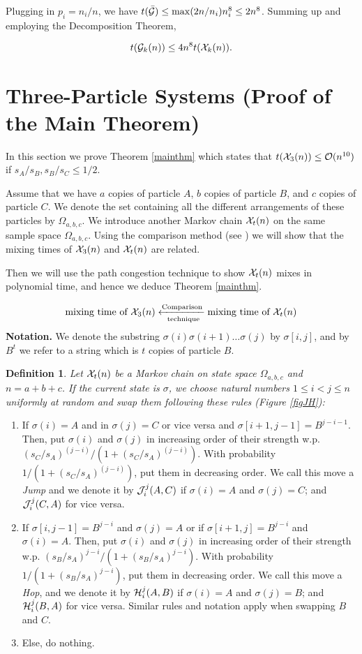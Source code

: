 \documentclass[10 pt]{article}
\newcommand{\G}{{\cal G}}
\newcommand{\EX}{{\cal X}}
\newcommand{\J}{{\cal J}}
\newcommand{\Ho}{{\cal H}}
\newtheorem{defin}{Definition}[section]
\begin{document}
Plugging in $p_i=n_i/n$, we have $t(\bar{\G})\leq \max( 2n/n_i) n_i^8\leq 2 n^8$. Summing up and employing the Decomposition Theorem,

$$t(\G_{k}(n))\leq 4 n^8 t(\EX_{k}(n)).$$

\section{ Three-Particle Systems (Proof of the Main Theorem)}\label{proof}

In this section we prove Theorem \ref{mainthm} which states that $t(\EX_3(n))\leq {\cal O}(n^{10}) $ if 
$s_A/s_B, s_B/s_C\leq 1/2$.

Assume that we have $a$ copies of particle $A$, $b$ copies of particle $B$, and $c$ copies of particle $C$.
We denote the set containing all the different arrangements of these particles by $\Omega_{a,b,c}$.
We introduce another Markov chain $\EX_t(n)$ on the same sample space $\Omega_{a,b,c}$.
Using the comparison method (see \cite{compare}) we will show that the mixing times of $\EX_3(n)$ and $\EX_t(n)$ are related.

Then we will use the path congestion technique to show $\EX_t(n)$ mixes in polynomial time, and hence we deduce Theorem \ref{mainthm}.


$$\text{mixing time of } \EX_3(n) \xleftarrow[\text{ technique}]{\text{Comparison}}\text{mixing time of } \EX_t(n) $$
\textbf{Notation.} We denote the substring $\sigma(i)\sigma(i+1)\dots\sigma(j)$ by $\sigma[i,j]$, and by $B^t$ we refer
to a string which is $t$ copies of particle $B$. 

\begin{defin}
Let  ${\EX}_t (n)$ be a Markov chain on state space $\Omega_{a,b,c}$ and $n=a+b+c$. If the current state is $\sigma$,
we choose natural numbers $1\leq i<j\leq n$ uniformly at random and swap them following these rules (Figure \ref{figJH}):
\end{defin}

\begin{enumerate}
\item If $\sigma(i)=A$  and in $\sigma(j)=C$ or vice versa and $\sigma[i{+}1,j{-}1]=B^{j-i-1}$.  Then,
put $\sigma(i)$ and $\sigma(j)$  in increasing order of their strength w.p.\ $(s_C/s_A)^{(j{-}i)}/(1+(s_{C}/s_A)^{(j{-}i)})$.
With probability $1/(1+(s_{C}/s_A)^{(j{-}i)})$, put them in decreasing order. We call this move a \emph{Jump} and we denote
it by $\J_{i}^{j}(A,C)$ if $\sigma(i)=A$ and $\sigma(j)=C$; and $\J_{i}^{j}(C,A)$ for vice versa. 

\item If $\sigma[i,j{-}1]=B^{j-i}$ and  $\sigma(j)=A $   or  if $\sigma[i+1,j]=B^{j-i}$ and  $\sigma(i)=A $.
Then, put $\sigma(i)$ and $\sigma(j)$ in increasing order of their strength w.p. $(s_{B}/s_A)^{j{-}i}/(1+(s_{B}/s_A)^{j{-}i})$.
With probability $1/(1+(s_{B}/s_A)^{j{-}i})$, put them in decreasing order. We call this move a \emph{Hop},
and we denote it by ${\Ho}_{i}^j(A,B)$  if $\sigma(i)=A$  and $\sigma(j)=B$; and ${\Ho}_{i}^{j}(B,A)$ for vice versa.
Similar rules and notation apply when swapping $B$ and $C$. 
\item Else, do nothing.
\end{enumerate}
\end{document}
